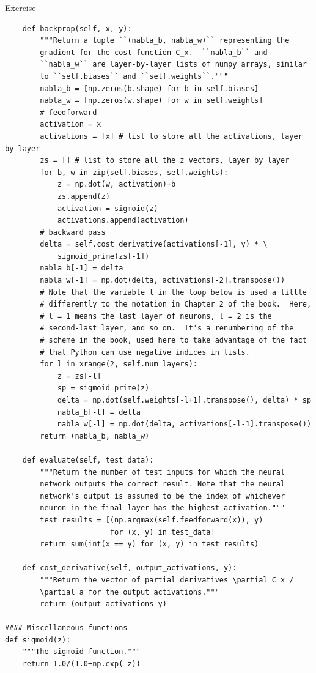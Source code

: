 \begin{exerciseBox}{Exercise}
\begin{lstlisting}
    def backprop(self, x, y):
        """Return a tuple ``(nabla_b, nabla_w)`` representing the
        gradient for the cost function C_x.  ``nabla_b`` and
        ``nabla_w`` are layer-by-layer lists of numpy arrays, similar
        to ``self.biases`` and ``self.weights``."""
        nabla_b = [np.zeros(b.shape) for b in self.biases]
        nabla_w = [np.zeros(w.shape) for w in self.weights]
        # feedforward
        activation = x
        activations = [x] # list to store all the activations, layer by layer
        zs = [] # list to store all the z vectors, layer by layer
        for b, w in zip(self.biases, self.weights):
            z = np.dot(w, activation)+b
            zs.append(z)
            activation = sigmoid(z)
            activations.append(activation)
        # backward pass
        delta = self.cost_derivative(activations[-1], y) * \
            sigmoid_prime(zs[-1])
        nabla_b[-1] = delta
        nabla_w[-1] = np.dot(delta, activations[-2].transpose())
        # Note that the variable l in the loop below is used a little
        # differently to the notation in Chapter 2 of the book.  Here,
        # l = 1 means the last layer of neurons, l = 2 is the
        # second-last layer, and so on.  It's a renumbering of the
        # scheme in the book, used here to take advantage of the fact
        # that Python can use negative indices in lists.
        for l in xrange(2, self.num_layers):
            z = zs[-l]
            sp = sigmoid_prime(z)
            delta = np.dot(self.weights[-l+1].transpose(), delta) * sp
            nabla_b[-l] = delta
            nabla_w[-l] = np.dot(delta, activations[-l-1].transpose())
        return (nabla_b, nabla_w)

    def evaluate(self, test_data):
        """Return the number of test inputs for which the neural
        network outputs the correct result. Note that the neural
        network's output is assumed to be the index of whichever
        neuron in the final layer has the highest activation."""
        test_results = [(np.argmax(self.feedforward(x)), y)
                        for (x, y) in test_data]
        return sum(int(x == y) for (x, y) in test_results)

    def cost_derivative(self, output_activations, y):
        """Return the vector of partial derivatives \partial C_x /
        \partial a for the output activations."""
        return (output_activations-y)

#### Miscellaneous functions
def sigmoid(z):
    """The sigmoid function."""
    return 1.0/(1.0+np.exp(-z))


\end{lstlisting}
\end{exerciseBox}
